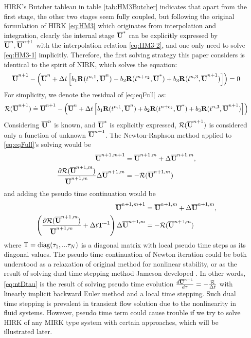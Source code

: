 \documentclass[preprint,12pt]{elsarticle}
\begin{document}
HIRK's Butcher tableau in table \ref{tab:HM3Butcher}
indicates that apart from the first stage,
the other two stages seem fully coupled,
but following the original formulation
of HIRK \eqref{eq:HM3} which originates from
interpolation and integration,
clearly the internal stage $\overline{\mathbf{U}}^*$ can be explicitly
expressed by $\overline{\mathbf{U}}^n, \overline{\mathbf{U}}^{n+1}$ with the interpolation
relation \eqref{eq:HM3-2}, and one only need
to solve \eqref{eq:HM3-1} implicitly.
Therefore, the first solving strategy this paper
considers is identical to the spirit of NIRK,
which solves the equation:
\begin{equation}
    \label{eq:eqFull}
    \overline{\mathbf{U}}^{n+1} -
    \left(\overline{\mathbf{U}}^{n} + \mathrm\Delta t
    \left[
        b_1\mathbf{R}(t^{n,1}, \overline{\mathbf{U}}^n) +
        b_2\mathbf{R}(t^{n+c_2}, \overline{\mathbf{U}}^*) +
        b_3\mathbf{R}(t^{n,3}, \overline{\mathbf{U}}^{n+1})
        \right]
    \right)  =  0
\end{equation}
For simplicity, we denote the residual of \eqref{eq:eqFull}
as:
\begin{equation}
    \mathcal{R}(\overline{\mathbf{U}}^{n+1}) \doteq \overline{\mathbf{U}}^{n+1} -
    \left(\overline{\mathbf{U}}^{n} + \mathrm\Delta t
    \left[
        b_1\mathbf{R}(t^{n,1}, \overline{\mathbf{U}}^{n}) +
        b_2\mathbf{R}(t^{n+c_2}, \overline{\mathbf{U}}^{*}) +
        b_3\mathbf{R}(t^{n,3}, \overline{\mathbf{U}}^{n+1})
        \right]
    \right)
\end{equation}
Considering $\overline{\mathbf{U}}^{n}$ is known,
and $\overline{\mathbf{U}}^{*}$ is explicitly expressed,
$\mathcal{R}(\overline{\mathbf{U}}^{n+1})$ is considered only a
function of unknown $\overline{\mathbf{U}}^{n+1}$.
The Newton-Raphson method applied to
\eqref{eq:eqFull}'s solving would be
\begin{equation}
    \begin{aligned}
        \overline{\mathbf{U}}^{n+1,m+1}                  & =  \overline{\mathbf{U}}^{n+1,m} + \mathrm\Delta \overline{\mathbf{U}}^{n+1,m}, \\
        \frac{\partial \mathcal{R}(\overline{\mathbf{U}}^{n+1,m})}
        {\overline{\mathbf{U}}^{n+1,m}} \mathrm\Delta \overline{\mathbf{U}}^{n+1,m} & = - \mathcal{R}(\overline{\mathbf{U}}^{n+1,m})
    \end{aligned}
\end{equation}
and adding the pseudo time continuation
would be
\begin{equation}
    \label{eq:ntDtau}
    \begin{aligned}
        \overline{\mathbf{U}}^{n+1,m+1}            & =  \overline{\mathbf{U}}^{n+1,m} + \mathrm\Delta \overline{\mathbf{U}}^{n+1,m}, \\
        \left(
        \frac{\partial \mathcal{R}(\overline{\mathbf{U}}^{n+1,m})}
        {\overline{\mathbf{U}}^{n+1,m}} + \mathrm\Delta t \mathrm{T}^{-1}
        \right) \mathrm\Delta \overline{\mathbf{U}}^{n+1,m} & = - \mathcal{R}(\overline{\mathbf{U}}^{n+1,m})
    \end{aligned}
\end{equation}
where $\mathrm{T}=\mathrm{diag}(\tau_1,...\tau_N)$ is a diagonal matrix with
local pseudo time steps as its diagonal values.
The pseudo time continuation of Newton iteration
could be both understood as a relaxation of original
method for nonlinear stability,
or as the result of solving dual time stepping
method Jameson developed \cite{jameson1991time}.
In other words, \eqref{eq:ntDtau} is the result
of solving pseudo time evolution
$\frac{d\overline{\mathbf{U}}^{n+1}}{d\tau} = -\frac{\mathcal{R}}{\mathrm\Delta t}$
with linearly implicit backward Euler method and
a local time stepping.
Such dual time stepping is prevalent in transient
flow solution due to the nonlinearity in
fluid systems.
However, pseudo time term could
cause trouble if we try to solve HIRK
of any MIRK type system with certain approaches, which
will be illustrated later.
\end{document}
